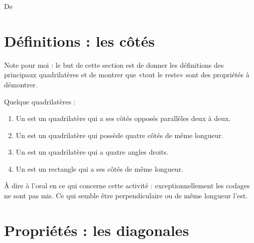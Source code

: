 

De \cite{NRHooXFvgpp5}

\section{Définitions : les côtés}

Note pour moi : le but de cette section est de donner les définitions des principaux quadrilatères et de montrer que «tout le reste» sont des propriétés à démontrer.
\begin{definition}
    Quelque quadrilatères :
    \begin{enumerate}
        \item
            Un  est un quadrilatère qui a ses côtés opposés parallèles deux à deux.
        \item
            Un  est un quadrilatère qui possède quatre côtés de même longueur.
        \item
            Un  est un quadrilatère qui a quatre angles droits.
        \item
            Un  est un rectangle qui a ses côtés de même longueur.
    \end{enumerate}
\end{definition}

À dire à l'oral en ce qui concerne cette activité : exceptionnellement les codages ne sont pas mis. Ce qui semble être perpendiculaire ou de même longueur l'est.


\section{Propriétés : les diagonales}

